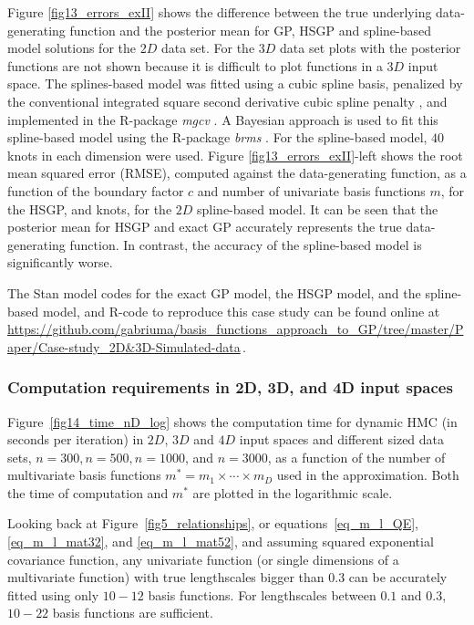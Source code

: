 Figure \ref{fig13_errors_exII} shows the difference  between the true underlying data-generating function and the posterior mean for GP, HSGP and spline-based model solutions for the $2D$ data set. For the $3D$ data set plots with the posterior functions are not shown because it is difficult to plot functions in a $3D$ input space. The splines-based model was fitted using a cubic spline basis, penalized by the conventional integrated square second derivative cubic spline penalty \citep{wood2017generalized}, and implemented in the R-package \textit{mgcv} \citep{wood2011mgcv}. A Bayesian approach is used to fit this spline-based model using the R-package \textit{brms} \citep{burkner2017brms}. For the spline-based model, $40$ knots in each dimension were used. Figure \ref{fig13_errors_exII}-left shows the root mean squared error (RMSE), computed against the data-generating function, as a function of the boundary factor $c$ and number of univariate basis functions $m$, for the HSGP, and knots, for the $2D$ spline-based model. It can be seen that the posterior mean for HSGP and exact GP accurately represents the true data-generating function. In contrast, the accuracy of the spline-based model is significantly worse. 

The Stan model codes for the exact GP model, the HSGP model, and the spline-based model, and R-code to reproduce this case study can be found online at {\small \url{https://github.com/gabriuma/basis_functions_approach_to_GP/tree/master/Paper/Case-study_2D&3D-Simulated-data}}\,.

\subsubsection{Computation requirements in 2D, 3D, and 4D input spaces}\label{sec_computation_nD}

Figure~\ref{fig14_time_nD_log} shows the computation time for dynamic HMC (in seconds per iteration) in $2D$, $3D$ and $4D$ input spaces and different sized data sets, $n=300, n=500, n=1000$, and $n=3000$, as a function of the number of multivariate basis functions $m^*=m_1\times \cdots \times m_D$ used in the approximation.
Both the time of computation and $m^*$ are plotted in the logarithmic scale. 

Looking back at Figure~\ref{fig5_relationships}, or equations~\eqref{eq_m_l_QE}, \eqref{eq_m_l_mat32}, and \eqref{eq_m_l_mat52}, and assuming squared exponential covariance function, any univariate function (or single dimensions of a multivariate function) with true lengthscales bigger than $0.3$ can be accurately fitted using only $10-12$ basis functions. For lengthscales between $0.1$ and $0.3$, $10-22$ basis functions are sufficient.

